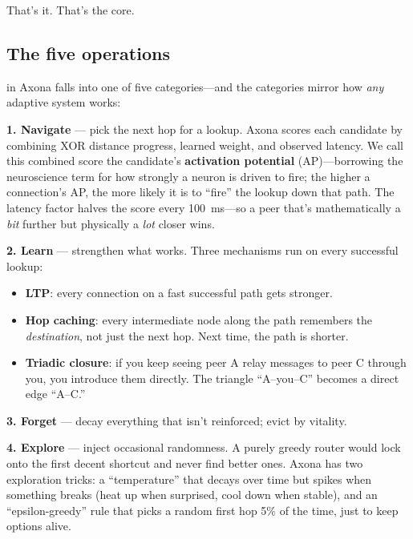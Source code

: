\documentclass[nobib,justified]{tufte-handout}
\begin{document}
That's it. That's the core.

\subsection{The five operations}

 in Axona falls into one of five categories---and the categories mirror how \emph{any} adaptive system works:

\textbf{1. Navigate} --- pick the next hop for a lookup. Axona scores each candidate by combining XOR distance progress, learned weight, and observed latency. We call this combined score the candidate's \textbf{activation potential} (AP)---borrowing the neuroscience term for how strongly a neuron is driven to fire; the higher a connection's AP, the more likely it is to ``fire'' the lookup down that path. The latency factor halves the score every 100~ms---so a peer that's mathematically a \emph{bit} further but physically a \emph{lot} closer wins.

\textbf{2. Learn} --- strengthen what works. Three mechanisms run on every successful lookup:

\begin{itemize}
  \item \textbf{LTP}: every connection on a fast successful path gets stronger.
  \item \textbf{Hop caching}: every intermediate node along the path remembers the \emph{destination}, not just the next hop. Next time, the path is shorter.
  \item \textbf{Triadic closure}: if you keep seeing peer A relay messages to peer C through you, you introduce them directly. The triangle ``A--you--C'' becomes a direct edge ``A--C.''
\end{itemize}

\textbf{3. Forget} --- decay everything that isn't reinforced; evict by vitality.

\textbf{4. Explore} --- inject occasional randomness. A purely greedy router would lock onto the first decent shortcut and never find better ones. Axona has two exploration tricks: a ``temperature'' that decays over time but spikes when something breaks (heat up when surprised, cool down when stable), and an ``epsilon-greedy'' rule that picks a random first hop 5\% of the time, just to keep options alive.
\end{document}
